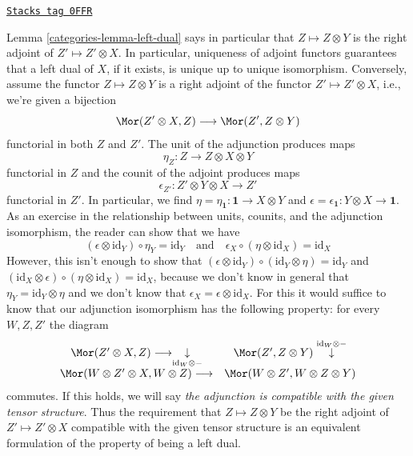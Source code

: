 \begin{remark}
\label{categories-remark-left-dual-adjoint}
\href{https://stacks.math.columbia.edu/tag/0FFR}{\texttt{Stacks tag 0FFR}}

Lemma \ref{categories-lemma-left-dual} says in particular that $Z \mapsto Z \otimes Y$
is the right adjoint of $Z' \mapsto Z' \otimes X$. In particular, uniqueness
of adjoint functors guarantees that a left dual of $X$, if it exists, is
unique up to unique isomorphism.
Conversely, assume the functor $Z \mapsto Z \otimes Y$ is a right adjoint of
the functor $Z' \mapsto Z' \otimes X$, i.e., we're given a bijection
$$
\Mor(Z' \otimes X, Z) \longrightarrow \Mor(Z', Z \otimes Y)
$$
functorial in both $Z$ and $Z'$. The unit of the adjunction produces
maps
$$
\eta_Z : Z \to Z \otimes X \otimes Y
$$
functorial in $Z$ and the counit of the adjoint produces maps
$$
\epsilon_{Z'} : Z' \otimes Y \otimes X \to Z'
$$
functorial in $Z'$. In particular, we find
$\eta = \eta_\mathbf{1} : \mathbf{1} \to X \otimes Y$ and
$\epsilon = \epsilon_\mathbf{1} : Y \otimes X \to \mathbf{1}$.
As an exercise in the relationship between units, counits, and
the adjunction isomorphism, the reader can show that we have
$$
(\epsilon \otimes \text{id}_Y) \circ \eta_Y = \text{id}_Y
\quad\text{and}\quad
\epsilon_X \circ (\eta \otimes \text{id}_X) = \text{id}_X
$$
However, this isn't enough to show that
$(\epsilon \otimes \text{id}_Y) \circ (\text{id}_Y \otimes \eta) =
\text{id}_Y$ and
$(\text{id}_X \otimes \epsilon) \circ (\eta \otimes \text{id}_X) =
\text{id}_X$, because we don't know in general that
$\eta_Y = \text{id}_Y \otimes \eta$ and we don't know that
$\epsilon_X = \epsilon \otimes \text{id}_X$. For this it would suffice
to know that our adjunction isomorphism has the following property:
for every $W, Z, Z'$ the diagram
$$
\begin{array}{cc}\Mor(Z' \otimes X, Z) \longrightarrow\underset{\text{id}_W \otimes -}{\downarrow} & \Mor(Z', Z \otimes Y) \overset{\text{id}_W \otimes -}{\downarrow} \\ \Mor(W \otimes Z' \otimes X, W \otimes Z) \longrightarrow & \Mor(W \otimes Z', W \otimes Z \otimes Y)\end{array}
$$
commutes.
If this holds, we will say {\it the adjunction is compatible with
the given tensor structure}. Thus the requirement that
$Z \mapsto Z \otimes Y$ be the right adjoint of $Z' \mapsto Z' \otimes X$
compatible with the given tensor structure is an equivalent formulation of the
property of being a left dual.
\end{remark}

